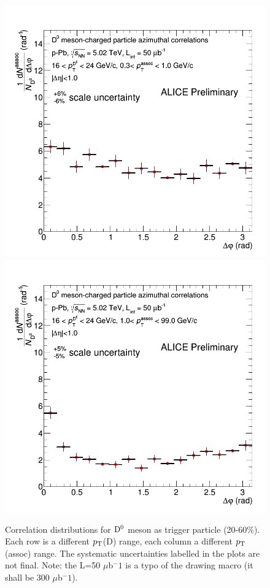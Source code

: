 \begin{figure}
{\includegraphics[width=0.32\linewidth]{figuresVsCent/Dzero/Correlations/2060/CanvaAndVariedHistopPbDzeroPt16to24assocPt03to1.png}}
{\includegraphics[width=0.32\linewidth]{figuresVsCent/Dzero/Correlations/2060/CanvaAndVariedHistopPbDzeroPt16to24assocPt1to99.png}}
 \caption{Correlation distributions for ${\rm D^0}$ meson as trigger particle (20-60\%). Each row is a different $p_{\rm T}$(D) range, each column a different $p_{\rm T}$(assoc) range. The systematic uncertainties labelled in the plots are not final. Note: the L=50 $\mu$b$^-1$ is a typo of the drawing macro (it shall be 300 $\mu$b$^-1$).}
\label{fig:Dzerocorr2060}
\end{figure}


